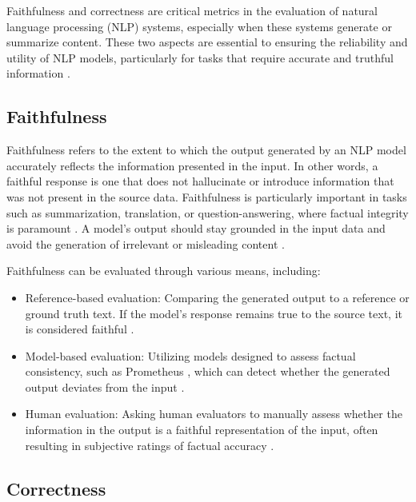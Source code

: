 Faithfulness and correctness are critical metrics in the evaluation of natural language processing (NLP) systems, especially when these systems generate or summarize content. These two aspects are essential to ensuring the reliability and utility of NLP models, particularly for tasks that require accurate and truthful information \cite{lyu2024faithfulmodelexplanationnlp}.

\subsection{Faithfulness}

Faithfulness refers to the extent to which the output generated by an NLP model accurately reflects the information presented in the input. In other words, a faithful response is one that does not hallucinate or introduce information that was not present in the source data. Faithfulness is particularly important in tasks such as summarization, translation, or question-answering, where factual integrity is paramount \cite{madsen-etal-2022-evaluating}. A model's output should stay grounded in the input data and avoid the generation of irrelevant or misleading content \cite{yin2022sensitivitystabilitymodelinterpretations}.

Faithfulness can be evaluated through various means, including: \begin{itemize} \item Reference-based evaluation: Comparing the generated output to a reference or ground truth text. If the model's response remains true to the source text, it is considered faithful \cite{parcalabescu2024measuringfaithfulnessselfconsistencynatural}. \item Model-based evaluation: Utilizing models designed to assess factual consistency, such as Prometheus \cite{kim2024prometheus2opensource}, which can detect whether the generated output deviates from the input \cite{gat2023faithfulexplanationsblackboxnlp}. \item Human evaluation: Asking human evaluators to manually assess whether the information in the output is a faithful representation of the input, often resulting in subjective ratings of factual accuracy \cite{jacovi-goldberg-2020-towards}. \end{itemize}

\subsection{Correctness}

